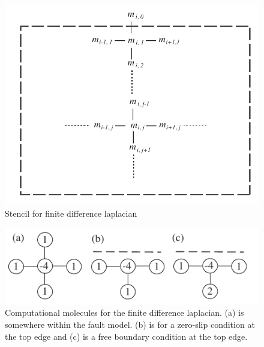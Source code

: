 \begin{figure}[!ht] 
  \centering
  \includegraphics[width=0.75\linewidth]{./figures/ch4/laplace_stencil.pdf}
    \caption[Stencil for finite difference laplacian]{Stencil for finite difference laplacian}
  \label{fig_stencil}
\end{figure}

\begin{figure}[!ht] 
  \centering
  \includegraphics[width=0.75\linewidth]{./figures/ch4/molecules.pdf}
    \caption[Computational molecules]{Computational molecules for the finite difference laplacian. (a) is somewhere within the fault model. (b) is for a zero-slip condition at the top edge and (c) is a free boundary condition at the top edge.}
  \label{fig_molecules}
\end{figure}

